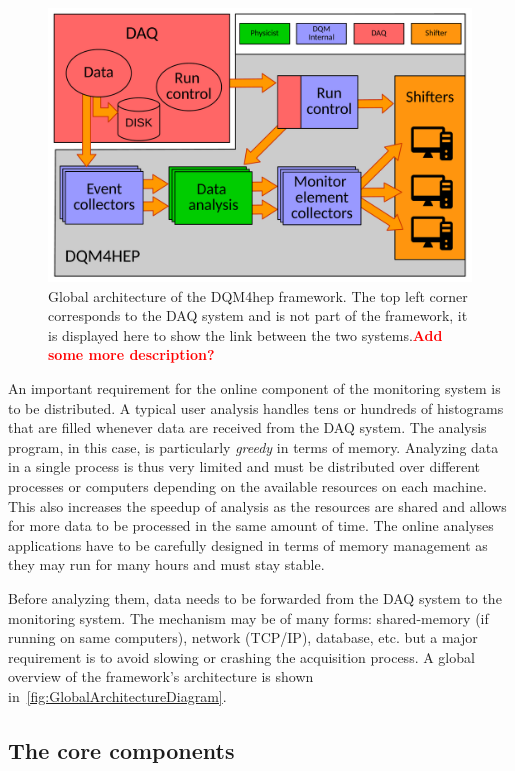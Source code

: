 \documentclass{webofc}
\begin{document}
\begin{figure}[!h]
  \centering
  \includegraphics[width=.95\textwidth]{figs/AnalysisModuleArchitecture.pdf}
  \caption{Global architecture of the DQM4hep framework. The top left corner corresponds to the DAQ system and is not part 
  of the framework, it is displayed here to show the link between the two systems.\textcolor{red}{\textbf{Add some more description?}}}
  \label{fig:GlobalArchitectureDiagram}
\end{figure}

An important requirement for the online component of the monitoring system is to be distributed. 
A typical user analysis handles tens or hundreds of histograms that are filled whenever data are received from the DAQ system. 
The analysis program, in this case, is particularly \textit{greedy} in terms of memory. 
Analyzing data in a single process is thus very limited and must be distributed over different processes or computers depending on the available resources on each machine.
This also increases the speedup of analysis as the resources are shared and allows for more data to be processed in the same amount of time.
The online analyses applications have to be carefully designed in terms of memory management as they may run for many hours and must stay stable.

Before analyzing them, data needs to be forwarded from the DAQ system to the monitoring system.
The mechanism may be of many forms: shared-memory (if running on same computers), network (TCP/IP), database, etc. but a major requirement is to avoid slowing or crashing the acquisition process.
A global overview of the framework's architecture is shown in~\autoref{fig:GlobalArchitectureDiagram}.

\subsection{The core components}
\label{subsec:core}
\end{document}
